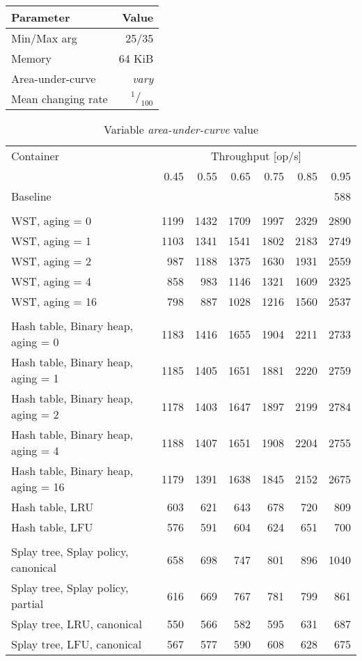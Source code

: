 \pagebreak

\begin{tabular}[h]{l r} \toprule
Parameter & Value \\ \midrule
Min/Max arg & 25/35 \\
Memory & 64 KiB \\
Area-under-curve & \emph{vary} \\
Mean changing rate & $^1/_{100}$ \\ \bottomrule
\end{tabular}

\begin{table}
\caption{Variable \emph{area-under-curve} value}
\begin{tabular}[]{l r r r r r r} \toprule
Container & \multicolumn{6}{c}{Throughput [op/s]} \\ \cmidrule(r){2-7}
& 0.45 & 0.55 & 0.65 & 0.75 & 0.85 & 0.95 \\ \midrule
Baseline & \multicolumn{6}{r}{588}  \\
\\
WST, aging = 0 & 1199 & 1432 & 1709 & 1997 & 2329 & 2890 \\
WST, aging = 1 & 1103 & 1341 & 1541 & 1802 & 2183 & 2749 \\
WST, aging = 2 & 987 & 1188 & 1375 & 1630 & 1931 & 2559 \\
WST, aging = 4 & 858 & 983 & 1146 & 1321 & 1609 & 2325 \\
WST, aging = 16 & 798 & 887 & 1028 & 1216 & 1560 & 2537 \\
\\
Hash table, Binary heap, aging = 0 & 1183 & 1416 & 1655 & 1904 & 2211 & 2733 \\
Hash table, Binary heap, aging = 1 & 1185 & 1405 & 1651 & 1881 & 2220 & 2759 \\
Hash table, Binary heap, aging = 2 & 1178 & 1403 & 1647 & 1897 & 2199 & 2784 \\
Hash table, Binary heap, aging = 4 & 1188 & 1407 & 1651 & 1908 & 2204 & 2755 \\
Hash table, Binary heap, aging = 16 & 1179 & 1391 & 1638 & 1845 & 2152 & 2675 \\
Hash table, LRU & 603 & 621 & 643 & 678 & 720 & 809 \\
Hash table, LFU & 576 & 591 & 604 & 624 & 651 & 700 \\
\\
Splay tree, Splay policy, canonical & 658 & 698 & 747 & 801 & 896 & 1040 \\
Splay tree, Splay policy, partial & 616 & 669 & 767 & 781 & 799 & 861 \\
Splay tree, LRU, canonical & 550 & 566 & 582 & 595 & 631 & 687 \\
Splay tree, LFU, canonical & 567 & 577 & 590 & 608 & 628 & 675 \\
\bottomrule
\end{tabular}
\end{table}

